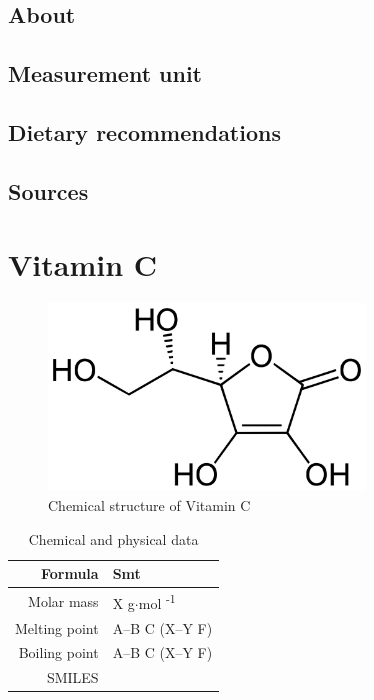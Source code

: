 \documentclass{book}
\begin{document}
\section{About}


\section{Measurement unit}


\section{Dietary recommendations}


\section{Sources}


\chapter{Vitamin C}
\begin{figure}[h]
	\caption{Chemical structure of Vitamin C}
	\centering \includegraphics[width=0.75\textwidth]{images/Vitamin_C_chemical_structure}
\end{figure}

\begin{table}[h]
	\caption{Chemical and physical data}
	\centering \begin{tabular}{| r | l |}
		\hline
		Formula & Smt\\ \hline
		Molar mass & X g$\cdot$mol \textsuperscript{-1}\\ \hline
		Melting point & A--B \degree C (X--Y \degree F)\\ \hline
		Boiling point & A--B \degree C (X--Y \degree F)\\ \hline
		SMILES & \\ \hline
	\end{tabular}
\end{table}
\newpage
\end{document}
